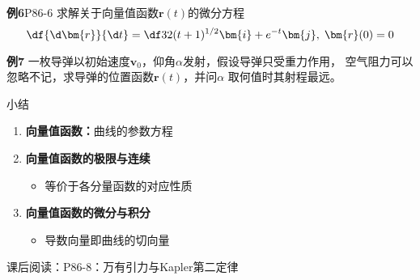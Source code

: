\begin{frame}
	\linespread{1.5}
	\begin{exampleblock}{{\bf 例6}\hfill P86-6}
		求解关于向量值函数$\bm{r}(t)$的微分方程
		$$\df{\d\bm{r}}{\d t}=\df 32(t+1)^{1/2}\bm{i}+e^{-t}\bm{j},\;\bm{r}(0)=0$$
	\end{exampleblock}
	\pause
	\begin{exampleblock}{{\bf 例7}\hfill}
		一枚导弹以初始速度$\bm{v}_0$，仰角$\alpha$发射，假设导弹只受重力作用，
		空气阻力可以忽略不记，求导弹的位置函数$\bm{r}(t)$，并问$\alpha$
		取何值时其射程最远。
	\end{exampleblock}
\end{frame}

\begin{frame}[<+->]{小结}
	\linespread{1.5}
	\begin{enumerate}
	  \item {\bf 向量值函数：}曲线的参数方程
	  \item {\bf 向量值函数的极限与连续}
	  \begin{itemize}
	    \item 等价于各分量函数的对应性质
	  \end{itemize}
	  \item {\bf 向量值函数的微分与积分}
	  \begin{itemize}
	    \item 导数向量即曲线的切向量
	  \end{itemize}
	\end{enumerate}
	
	\pause
	{\bb 课后阅读：}\alert{P86-8：万有引力与Kapler第二定律}
\end{frame}